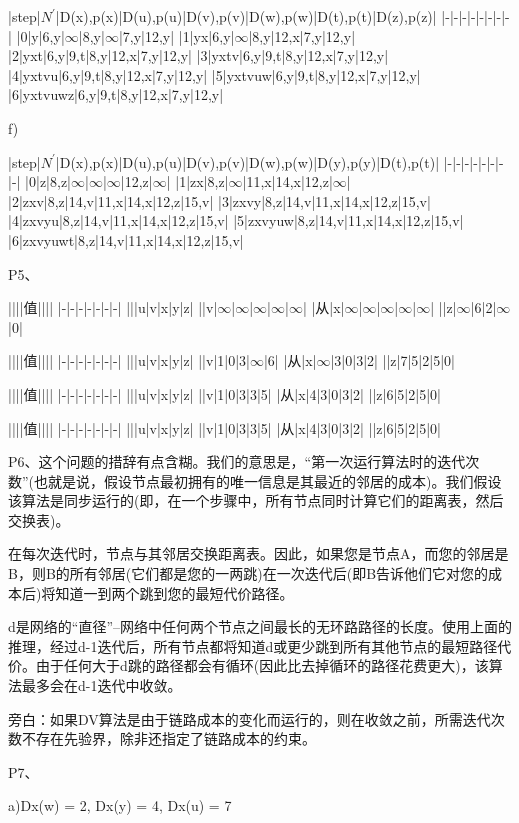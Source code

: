\documentclass[11pt,UTF8,twoside]{article}
\begin{document}
	|step|$N^{'}$|D(x),p(x)|D(u),p(u)|D(v),p(v)|D(w),p(w)|D(t),p(t)|D(z),p(z)|
	|-|-|-|-|-|-|-|-|
	|0|y|6,y|$\infty$|8,y|$\infty$|7,y|12,y|
	|1|yx|6,y|$\infty$|8,y|12,x|7,y|12,y|
	|2|yxt|6,y|9,t|8,y|12,x|7,y|12,y|
	|3|yxtv|6,y|9,t|8,y|12,x|7,y|12,y|
	|4|yxtvu|6,y|9,t|8,y|12,x|7,y|12,y|
	|5|yxtvuw|6,y|9,t|8,y|12,x|7,y|12,y|
	|6|yxtvuwz|6,y|9,t|8,y|12,x|7,y|12,y|
	
	f)
	
	|step|$N^{'}$|D(x),p(x)|D(u),p(u)|D(v),p(v)|D(w),p(w)|D(y),p(y)|D(t),p(t)|
	|-|-|-|-|-|-|-|-|
	|0|z|8,z|$\infty$|$\infty$|$\infty$|12,z|$\infty$|
	|1|zx|8,z|$\infty$|11,x|14,x|12,z|$\infty$|
	|2|zxv|8,z|14,v|11,x|14,x|12,z|15,v|
	|3|zxvy|8,z|14,v|11,x|14,x|12,z|15,v|
	|4|zxvyu|8,z|14,v|11,x|14,x|12,z|15,v|
	|5|zxvyuw|8,z|14,v|11,x|14,x|12,z|15,v|
	|6|zxvyuwt|8,z|14,v|11,x|14,x|12,z|15,v|
	
	
	P5、
	
	||||值||||
	|-|-|-|-|-|-|-|
	|||u|v|x|y|z|
	||v|$\infty$|$\infty$|$\infty$|$\infty$|$\infty$|
	|从|x|$\infty$|$\infty$|$\infty$|$\infty$|$\infty$|
	||z|$\infty$|6|2|$\infty$|0|
	
	||||值||||
	|-|-|-|-|-|-|-|
	|||u|v|x|y|z|
	||v|1|0|3|$\infty$|6|
	|从|x|$\infty$|3|0|3|2|
	||z|7|5|2|5|0|
	
	||||值||||
	|-|-|-|-|-|-|-|
	|||u|v|x|y|z|
	||v|1|0|3|3|5|
	|从|x|4|3|0|3|2|
	||z|6|5|2|5|0|
	
	||||值||||
	|-|-|-|-|-|-|-|
	|||u|v|x|y|z|
	||v|1|0|3|3|5|
	|从|x|4|3|0|3|2|
	||z|6|5|2|5|0|
	
	P6、这个问题的措辞有点含糊。我们的意思是，“第一次运行算法时的迭代次数”(也就是说，假设节点最初拥有的唯一信息是其最近的邻居的成本)。我们假设该算法是同步运行的(即，在一个步骤中，所有节点同时计算它们的距离表，然后交换表)。
	
	在每次迭代时，节点与其邻居交换距离表。因此，如果您是节点A，而您的邻居是B，则B的所有邻居(它们都是您的一两跳)在一次迭代后(即B告诉他们它对您的成本后)将知道一到两个跳到您的最短代价路径。
	
	d是网络的“直径”--网络中任何两个节点之间最长的无环路路径的长度。使用上面的推理，经过d-1迭代后，所有节点都将知道d或更少跳到所有其他节点的最短路径代价。由于任何大于d跳的路径都会有循环(因此比去掉循环的路径花费更大)，该算法最多会在d-1迭代中收敛。
	
	旁白：如果DV算法是由于链路成本的变化而运行的，则在收敛之前，所需迭代次数不存在先验界，除非还指定了链路成本的约束。
	
	P7、
	
	a)Dx(w) = 2, Dx(y) = 4, Dx(u) = 7 
	
\end{document}
